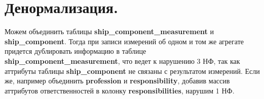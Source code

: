 \documentclass{article}
\begin{document}
\section{Денормализация.}
    Можем объединить таблицы \textbf{ship\_component\_measurement} и \textbf{ship\_component}. Тогда при записи измерений об одном и том же агрегате придется дублировать информацию в таблице \textbf{ship\_component\_measurement}, что ведет к нарушению 3 НФ, так как аттрибуты таблицы \textbf{ship\_component} не связаны с результатом измерений. Если же, например объединить \textbf{profession} и \textbf{responsibility}, добавив массив аттрибутов ответственностей в колонку \textbf{responsibilities}, нарушим 1 НФ.
\end{document}
